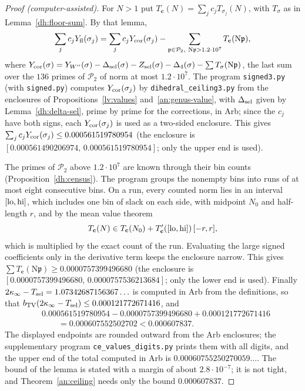 \begin{proof}[Proof (computer-assisted)]
For $N>1$ put $T_{\mathbf c}(N)=\sum_jc_jT_{\sigma_j}(N)$, with $T_\sigma$ as
in Lemma~\ref{dh:floor-sum}. By that lemma,
\[
 \sum_jc_jY_{\rm fl}(\sigma_j)=\sum_jc_jY_{\rm cor}(\sigma_j)
 -\sum_{\mathfrak p\in\mathcal P_2,\ \mathrm N\mathfrak p>1.2\cdot10^7}
 T_{\mathbf c}(\mathrm N\mathfrak p),
\]
where $Y_{\rm cor}(\sigma)=Y_{W''}(\sigma)-\Delta_{\rm sel}(\sigma)
-Z_{\rm sel}(\sigma)-\Delta_4(\sigma)-\sum T_\sigma(\mathrm N\mathfrak p)$, the
last sum over the $136$ primes of $\mathcal P_2$ of norm at most
$1.2\cdot10^7$. The program \texttt{signed3.py} (with \texttt{signed.py})
computes $Y_{\rm cor}(\sigma_j)$ by \texttt{dihedral\_ceiling3.py} from the
enclosures of Propositions~\ref{lv:values} and~\ref{an:genus-value}, with
$\Delta_{\rm sel}$ given by Lemma~\ref{dh:delta-sel}, prime by prime for the
corrections, in Arb; since the $c_j$ have both signs, each
$Y_{\rm cor}(\sigma_j)$ is used as a two-sided enclosure. This gives
$\sum_jc_jY_{\rm cor}(\sigma_j)\le0.000561519780954$ (the enclosure is
$[0.000561490206974,\,0.000561519780954]$; only the upper end is used).

The primes of $\mathcal P_2$ above $1.2\cdot10^7$ are known through their bin
counts (Proposition~\ref{dh:census}). The program groups the nonempty bins
into runs of at most eight consecutive bins. On a run, every counted norm
lies in an interval $[{\rm lo},{\rm hi}]$, which includes one bin of slack on
each side, with midpoint $N_0$ and half-length $r$, and by the mean value
theorem
\[
 T_{\mathbf c}(N)\in T_{\mathbf c}(N_0)+T_{\mathbf c}'([{\rm lo},{\rm hi}])\,[-r,r],
\]
which is multiplied by the exact count of the run. Evaluating the large
signed coefficients only in the derivative term keeps the enclosure narrow.
This gives $\sum T_{\mathbf c}(\mathrm N\mathfrak p)\ge0.0000757399496680$
(the enclosure is $[0.0000757399496680,\,0.0000757536213684]$; only the lower
end is used). Finally $2\kappa_\infty-T_{\rm sel}=1.07342687156367\ldots$ is
computed in Arb from the definitions, so that
$b_{\rm TV}(2\kappa_\infty-T_{\rm sel})\le0.000121772671416$, and
\begin{align*}
 &0.000561519780954-0.0000757399496680+0.000121772671416\\
 &\qquad=0.000607552502702<0.000607837.
\end{align*}
The displayed endpoints are rounded outward from the Arb enclosures; the
supplementary program \texttt{ce\_values\_digits.py} prints them with all
digits, and the upper end of the total computed in Arb is
$0.00060755250270059\ldots$. The bound of the lemma is stated with a margin
of about $2.8\cdot10^{-7}$; it is not tight, and Theorem~\ref{an:ceiling}
needs only the bound $0.000607837$.
\end{proof}

